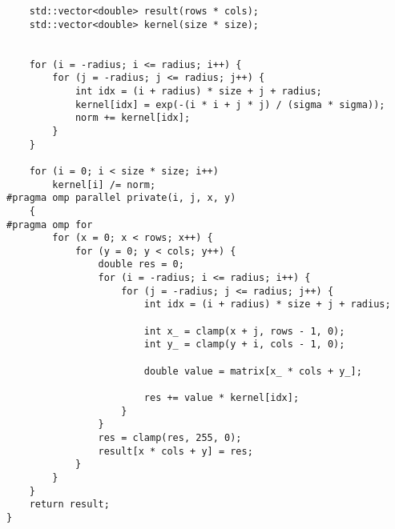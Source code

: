 \documentclass{report}
\begin{document}
\begin{lstlisting}
    std::vector<double> result(rows * cols);
    std::vector<double> kernel(size * size);


    for (i = -radius; i <= radius; i++) {
        for (j = -radius; j <= radius; j++) {
            int idx = (i + radius) * size + j + radius;
            kernel[idx] = exp(-(i * i + j * j) / (sigma * sigma));
            norm += kernel[idx];
        }
    }

    for (i = 0; i < size * size; i++)
        kernel[i] /= norm;
#pragma omp parallel private(i, j, x, y)
    {
#pragma omp for
        for (x = 0; x < rows; x++) {
            for (y = 0; y < cols; y++) {
                double res = 0;
                for (i = -radius; i <= radius; i++) {
                    for (j = -radius; j <= radius; j++) {
                        int idx = (i + radius) * size + j + radius;

                        int x_ = clamp(x + j, rows - 1, 0);
                        int y_ = clamp(y + i, cols - 1, 0);

                        double value = matrix[x_ * cols + y_];

                        res += value * kernel[idx];
                    }
                }
                res = clamp(res, 255, 0);
                result[x * cols + y] = res;
            }
        }
    }
    return result;
}


\end{lstlisting}
\end{document}
